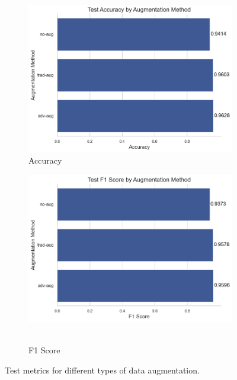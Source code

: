 \begin{figure}[!htb]
    \centering
    \begin{subfigure}{0.45\textwidth}
        \includegraphics[width=\textwidth]{Images/flowers-results/test_acc.png}
        \caption{Accuracy}
    \end{subfigure}
    \vspace{0.3cm}
    \hfill
    \begin{subfigure}{0.45\textwidth}
        \includegraphics[width=\textwidth]{Images/flowers-results/test_f1.png}\
        \caption{F1 Score}
    \end{subfigure}
    \vspace{0.3cm}

    \caption{Test metrics for different types of data augmentation.}
    \label{fig:testAllAug}
\end{figure}


